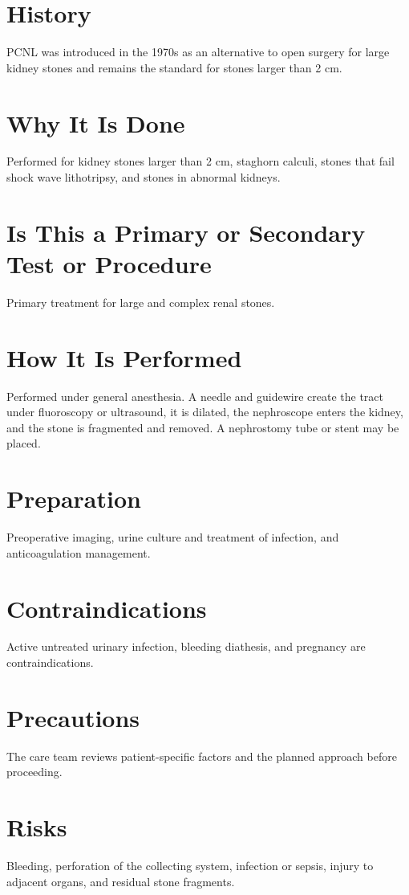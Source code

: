 \section*{History}
PCNL was introduced in the 1970s as an alternative to open surgery for large kidney stones and remains the standard for stones larger than 2 cm.

\section*{Why It Is Done}
Performed for kidney stones larger than 2 cm, staghorn calculi, stones that fail shock wave lithotripsy, and stones in abnormal kidneys.

\section*{Is This a Primary or Secondary Test or Procedure}
Primary treatment for large and complex renal stones.

\section*{How It Is Performed}
Performed under general anesthesia. A needle and guidewire create the tract under fluoroscopy or ultrasound, it is dilated, the nephroscope enters the kidney, and the stone is fragmented and removed. A nephrostomy tube or stent may be placed.

\section*{Preparation}
Preoperative imaging, urine culture and treatment of infection, and anticoagulation management.

\section*{Contraindications}
Active untreated urinary infection, bleeding diathesis, and pregnancy are contraindications.

\section*{Precautions}
The care team reviews patient-specific factors and the planned approach before proceeding.

\section*{Risks}
Bleeding, perforation of the collecting system, infection or sepsis, injury to adjacent organs, and residual stone fragments.


